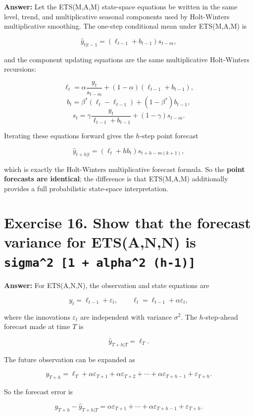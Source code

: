 \documentclass[
  11pt,
]{article}
\begin{document}
\textbf{Answer:} Let the ETS(M,A,M) state-space equations be written in
the same level, trend, and multiplicative seasonal components used by
Holt-Winters multiplicative smoothing. The one-step conditional mean
under ETS(M,A,M) is

\[
\hat{y}_{t|t-1} = (\ell_{t-1} + b_{t-1}) s_{t-m},
\]

and the component updating equations are the same multiplicative
Holt-Winters recursions:

\[
\ell_t = \alpha\frac{y_t}{s_{t-m}} + (1-\alpha)(\ell_{t-1}+b_{t-1}),
\] \[
b_t = \beta^*(\ell_t-\ell_{t-1}) + (1-\beta^*)b_{t-1},
\] \[
s_t = \gamma\frac{y_t}{\ell_{t-1}+b_{t-1}} + (1-\gamma)s_{t-m}.
\]

Iterating these equations forward gives the \(h\)-step point forecast

\[
\hat{y}_{t+h|t} = (\ell_t + hb_t) s_{t+h-m(k+1)},
\]

which is exactly the Holt-Winters multiplicative forecast formula. So
the \textbf{point forecasts are identical}; the difference is that
ETS(M,A,M) additionally provides a full probabilistic state-space
interpretation.

\section{\texorpdfstring{Exercise 16. Show that the forecast variance
for ETS(A,N,N) is
\texttt{sigma\^{}2\ {[}1\ +\ alpha\^{}2\ (h-1){]}}}{Exercise 16. Show that the forecast variance for ETS(A,N,N) is sigma\^{}2 {[}1 + alpha\^{}2 (h-1){]}}}\label{exercise-16.-show-that-the-forecast-variance-for-etsann-is-sigma2-1-alpha2-h-1}

\textbf{Answer:} For ETS(A,N,N), the observation and state equations are

\[
y_t = \ell_{t-1} + \varepsilon_t,
\qquad
\ell_t = \ell_{t-1} + \alpha \varepsilon_t,
\]

where the innovations \(\varepsilon_t\) are independent with variance
\(\sigma^2\). The \(h\)-step-ahead forecast made at time \(T\) is

\[
\hat{y}_{T+h|T} = \ell_T.
\]

The future observation can be expanded as

\[
y_{T+h} = \ell_T + \alpha \varepsilon_{T+1} + \alpha \varepsilon_{T+2} + \cdots + \alpha \varepsilon_{T+h-1} + \varepsilon_{T+h}.
\]

So the forecast error is

\[
y_{T+h} - \hat{y}_{T+h|T}
= \alpha \varepsilon_{T+1} + \cdots + \alpha \varepsilon_{T+h-1} + \varepsilon_{T+h}.
\]
\end{document}
